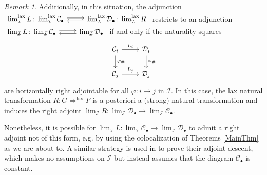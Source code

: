 \documentclass[a4paper,reqno,10pt]{amsart}
\theoremstyle{definition}
\theoremstyle{remark}
\newtheorem{remark}[theorem]{Remark}
\newcommand{\sqb}[1]{\left\lbrack #1\right\rbrack}
\newcommand{\C}{\mathcal{C}}
\newcommand{\D}{\mathcal{D}}
\newcommand{\I}{\mathcal{I}}
\newcommand{\Fun}{\operatorname{Fun}}
\newcommand{\Cat}{\mathrm{Cat}}
\newcommand{\lax}{\mathrm{lax}}
\newcommand{\op}{\mathrm{op}}
\newcommand{\singlequote}[1]{\textquotesingle #1\textquotesingle}
\newcommand{\Adj}{\arrow[r,shift left=0.2em]\arrow[r,leftarrow,shift right=0.2em]}
\begin{document}
\begin{remark}\label{AdjunctionOnLaxLimitsRmk}
Additionally, in this situation, the adjunction $\begin{tikzcd}\lim^{\lax}_{\I}L\colon\lim^{\lax}_{\I}\C_{\bullet}\Adj & \lim^{\lax}_{\I}\D_{\bullet}\colon\lim^{\lax}_{\I}R\end{tikzcd}$ restricts to an adjunction $\begin{tikzcd}\lim_{\I}L\colon\lim_{\I}\C_{\bullet}\Adj & \lim_{\I}\D_{\bullet}\end{tikzcd}$ if and only if the naturality squares
\begin{equation*}
\begin{tikzcd}
\C_i\arrow[r,"L_i"]\arrow[d,"\varphi_{\#}"] & \D_i\arrow[d,"\varphi_{\#}"]\\
\C_j\arrow[r,"L_j"] & \D_j
\end{tikzcd}
\end{equation*}
are horizontally right adjointable for all $\varphi\colon i\rightarrow j$ in $\I$. In this case, the lax natural transformation $R\colon G\Rightarrow^{\lax}F$ is a posteriori a (strong) natural transformation and induces the right adjoint $\lim_{\I}R\colon\lim_{\I}\D_{\bullet}\rightarrow\lim_{\I}\C_{\bullet}$.

\end{remark}

Nonetheless, it is possible for $\lim_{\I}L\colon\lim_{\I}\C_{\bullet}\rightarrow\lim_{\I}\D_{\bullet}$ to admit a right adjoint not of this form, e.g. by using the colocalization of Theorems \ref{MainThm} as we are about to. A similar strategy is used in \cite{HorevYanovski} to prove their \singlequote{adjoint descent}, which makes no assumptions on $\I$ but instead assumes that the diagram $\C_{\bullet}$ is constant.
\end{document}
